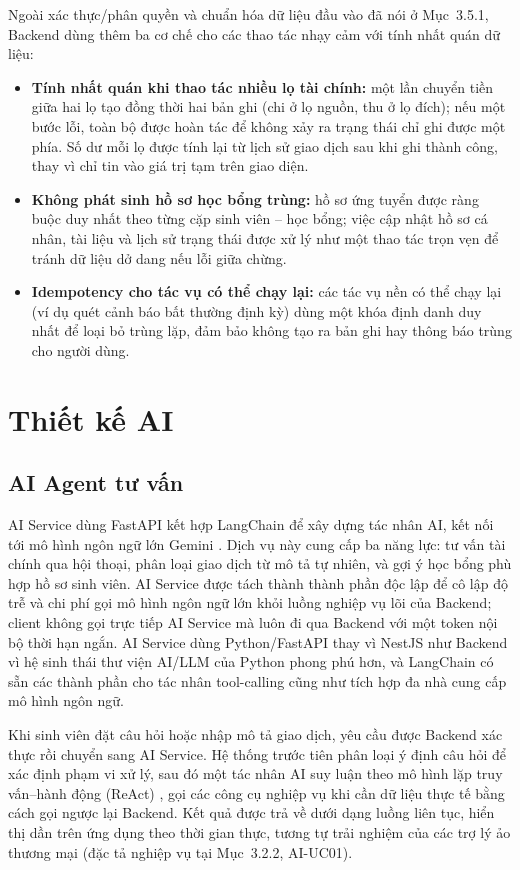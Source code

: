 Ngoài xác thực/phân quyền và chuẩn hóa dữ liệu đầu vào đã nói ở Mục~3.5.1, Backend dùng thêm ba cơ chế cho các thao tác nhạy cảm với tính nhất quán dữ liệu:

\begin{itemize}
    \item \textbf{Tính nhất quán khi thao tác nhiều lọ tài chính:} một lần chuyển tiền giữa hai lọ tạo đồng thời hai bản ghi (chi ở lọ nguồn, thu ở lọ đích); nếu một bước lỗi, toàn bộ được hoàn tác để không xảy ra trạng thái chỉ ghi được một phía. Số dư mỗi lọ được tính lại từ lịch sử giao dịch sau khi ghi thành công, thay vì chỉ tin vào giá trị tạm trên giao diện.
    \item \textbf{Không phát sinh hồ sơ học bổng trùng:} hồ sơ ứng tuyển được ràng buộc duy nhất theo từng cặp sinh viên -- học bổng; việc cập nhật hồ sơ cá nhân, tài liệu và lịch sử trạng thái được xử lý như một thao tác trọn vẹn để tránh dữ liệu dở dang nếu lỗi giữa chừng.
    \item \textbf{Idempotency cho tác vụ có thể chạy lại:} các tác vụ nền có thể chạy lại (ví dụ quét cảnh báo bất thường định kỳ) dùng một khóa định danh duy nhất để loại bỏ trùng lặp, đảm bảo không tạo ra bản ghi hay thông báo trùng cho người dùng.
\end{itemize}

\section{Thiết kế AI}

\subsection{AI Agent tư vấn}
AI Service dùng FastAPI \cite{fastapi-docs} kết hợp LangChain \cite{langchain-docs} để xây dựng tác nhân AI, kết nối tới mô hình ngôn ngữ lớn Gemini \cite{gemini-api}. Dịch vụ này cung cấp ba năng lực: tư vấn tài chính qua hội thoại, phân loại giao dịch từ mô tả tự nhiên, và gợi ý học bổng phù hợp hồ sơ sinh viên. AI Service được tách thành thành phần độc lập để cô lập độ trễ và chi phí gọi mô hình ngôn ngữ lớn khỏi luồng nghiệp vụ lõi của Backend; client không gọi trực tiếp AI Service mà luôn đi qua Backend với một token nội bộ thời hạn ngắn. AI Service dùng Python/FastAPI thay vì NestJS như Backend vì hệ sinh thái thư viện AI/LLM của Python phong phú hơn, và LangChain có sẵn các thành phần cho tác nhân tool-calling cũng như tích hợp đa nhà cung cấp mô hình ngôn ngữ.

Khi sinh viên đặt câu hỏi hoặc nhập mô tả giao dịch, yêu cầu được Backend xác thực rồi chuyển sang AI Service. Hệ thống trước tiên phân loại ý định câu hỏi để xác định phạm vi xử lý, sau đó một tác nhân AI suy luận theo mô hình lặp truy vấn--hành động (ReAct) \cite{yao2022-react}, gọi các công cụ nghiệp vụ khi cần dữ liệu thực tế bằng cách gọi ngược lại Backend. Kết quả được trả về dưới dạng luồng liên tục, hiển thị dần trên ứng dụng theo thời gian thực, tương tự trải nghiệm của các trợ lý ảo thương mại (đặc tả nghiệp vụ tại Mục~3.2.2, AI-UC01).

